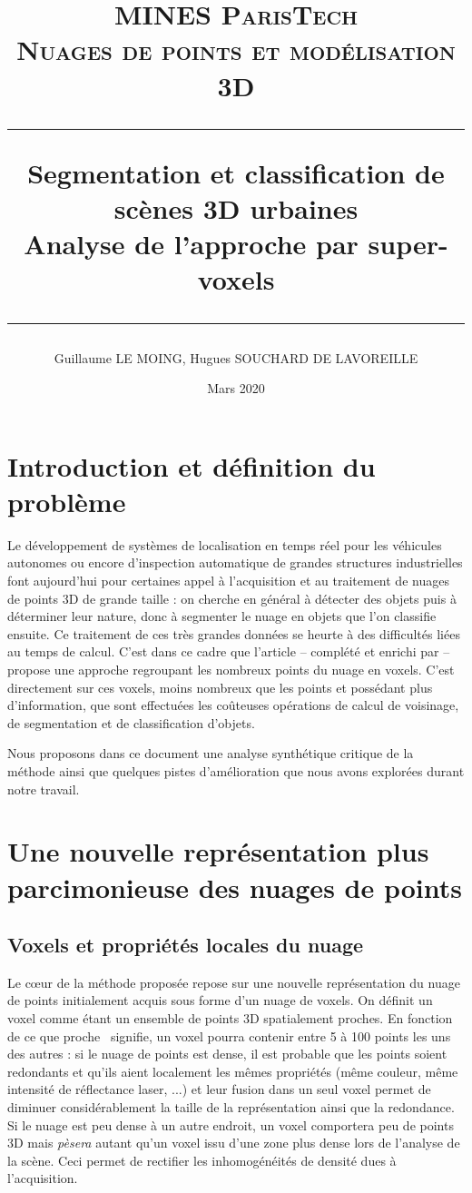 \documentclass[a4paper, onecolumn, 11pt]{article}
\title{
\normalfont \normalsize
\textsc{MINES ParisTech\\ Nuages de points et modélisation 3D } \\
\vspace{2cm}\hrule\vspace{1cm}
\huge Segmentation et classification de scènes 3D urbaines \\Analyse de l'approche par super-voxels
\vspace{1cm}\hrule\vspace{1cm}
}
\author{Guillaume LE MOING, Hugues SOUCHARD DE LAVOREILLE}
\date{\vspace{12cm} Mars 2020}
\begin{document}
\maketitle

\tableofcontents

\section{Introduction et définition du problème}
Le développement de systèmes de localisation en temps réel pour les véhicules autonomes ou encore d'inspection automatique de grandes structures industrielles font aujourd'hui pour certaines appel à l'acquisition et au traitement de nuages de points 3D de grande taille : on cherche en général à détecter des objets puis à déterminer leur nature, donc à segmenter le nuage en objets que l'on classifie ensuite. Ce traitement de ces très grandes données se heurte à des difficultés liées au temps de calcul. C'est dans ce cadre que l'article \cite{aka_article} – complété et enrichi par \cite{aka_thesis} – propose une approche regroupant les nombreux points du nuage en voxels. C'est directement sur ces voxels, moins nombreux que les points et possédant plus d'information, que sont effectuées les coûteuses opérations de calcul de voisinage, de segmentation et de classification d'objets.

Nous proposons dans ce document une analyse synthétique critique de la méthode ainsi que quelques pistes d'amélioration que nous avons explorées durant notre travail.

\section{Une nouvelle représentation plus parcimonieuse des nuages de points}
\subsection{Voxels et propriétés locales du nuage}
Le cœur de la méthode proposée repose sur une nouvelle représentation du nuage de points initialement acquis sous forme d'un nuage de voxels. On définit un voxel comme étant un ensemble de points 3D spatialement proches. En fonction de ce que \og proche \fg\ signifie, un voxel pourra contenir entre 5 à 100 points les uns des autres : si le nuage de points est dense, il est probable que les points soient redondants et qu'ils aient localement les mêmes propriétés (même couleur, même intensité de réflectance laser, ...) et leur fusion dans un seul voxel permet de diminuer considérablement la taille de la représentation ainsi que la redondance. Si le nuage est peu dense à un autre endroit, un voxel comportera peu de points 3D mais \emph{pèsera} autant qu'un voxel issu d'une zone plus dense lors de l'analyse de la scène. Ceci permet de rectifier les inhomogénéités de densité dues à l'acquisition.
\end{document}
